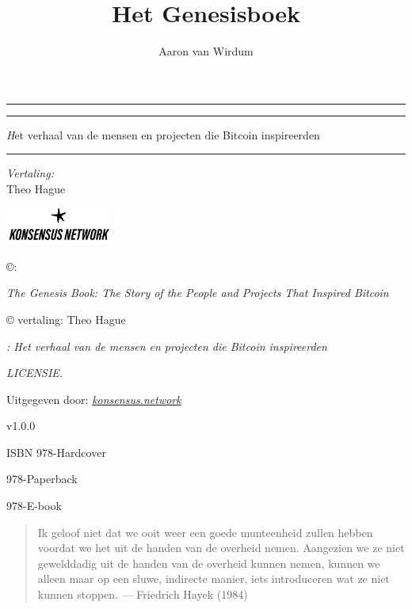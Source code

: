 \documentclass[smalldemyvopaper,11pt,twoside,onecolumn,openright,extrafontsizes,hidelinks]{memoir}
\title{Het Genesisboek}
\author{Aaron van Wirdum}
\newcommand{\subtitle}{Het verhaal van de mensen en projecten die Bitcoin inspireerden}
\newcommand{\titleoriginal}{The Genesis Book}
\newcommand{\subtitleoriginal}{The Story of the People and Projects That Inspired Bitcoin}
\newcommand{\ISBNHC}{978-}
\newcommand{\ISBNSC}{978-}
\newcommand{\ISBNEBOOK}{978-}
\newcommand{\press}{Konsensus Network}
\newcommand{\translatorone}{Theo Hague}
\newcommand{\translators}{
\large\textit{Vertaling:}\\
\translatorone\\
}
\newcommand*\halftitlepage{\begingroup %
  \setlength\drop{0.1\textheight}
  \begin{center}
  \vspace*{\drop}
  \rule{\textwidth}{0in}\par
  {\Large\sffamily\thetitle\par}
  \rule{\textwidth}{0in}\par
  \vfill
  \end{center}
\endgroup}
\newlength\drop
\newcommand*\titleM{\begingroup %
  \setlength\drop{0.15\textheight}
  \begin{center}
  \vspace*{\drop}
  {\huge\sffamily\thetitle\par}
  \vspace{2em}
  {\normalsize\sffamily\textit\subtitle\par}
  \vspace{2em}
  \rule{5.5cm}{0.3mm}\par
  \vspace{2em}
  {\Large\sffamily\textit\theauthor\par}
  \vspace{3em}
  {\footnotesize\sffamily\textit\translators\par}
  \vfill
  \includegraphics[width=3.5cm]{figures/knw.png}\par
  \end{center}
\endgroup}
\begin{document}
\frontmatter
\pagestyle{empty}
\halftitlepage
\cleardoublepage

\titleM
\clearpage

\vphantom{just for the drop}
\vfill
\begin{scriptsize}
\noindent \copyright{}: \theauthor
\par\noindent \textit{\titleoriginal : \subtitleoriginal}

\vspace{0.5\baselineskip}

\noindent \copyright{} vertaling: \translatorone\par\noindent \textit{\thetitle : \subtitle}

\vspace{\baselineskip}

\noindent \textit{LICENSIE.}

\vspace{0.5\baselineskip}

\noindent Uitgegeven door: \href{https://konsensus.network}{\textit{konsensus.network}}

\vspace{0.5\baselineskip}

\noindent v1.0.0

\vspace{0.5\baselineskip}

\setlength{\parindent}{2em}%
\noindent ISBN \ISBNHC \:Hardcover

\hspace{0.28\parindent}\ISBNSC \:Paperback

\hspace{0.28\parindent}\ISBNEBOOK \:E-book
\setlength{\parindent}{0pt}

\end{scriptsize}
\vspace{3em}
\par

\setcounter{footnote}{0}
\clearpage

\begin{center}
  \begin{vplace}[0.7]
    \begin{quote}
      Ik geloof niet dat we ooit weer een goede munteenheid zullen hebben
      voordat we het uit de handen van de overheid nemen. Aangezien we ze niet
      gewelddadig uit de handen van de overheid kunnen nemen, kunnen we alleen
      maar op een sluwe, indirecte manier, iets introduceren wat ze niet
      kunnen stoppen. --- Friedrich Hayek (1984)
    \end{quote}
  \end{vplace}
\end{center}
\cleardoublepage
\end{document}
